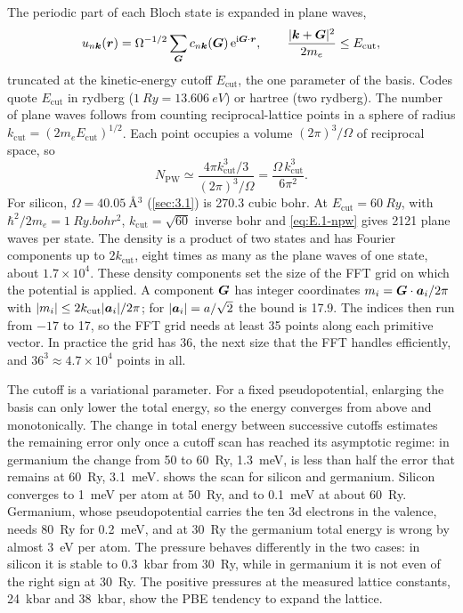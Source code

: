 The periodic part of each Bloch state is expanded in plane waves,
\begin{equation*}
  u_{n\bm{k}}(\bm{r}) = \Omega^{-1/2}\sum_{\bm{G}}c_{n\bm{k}}(\bm{G})\,\mathrm{e}^{\mathrm{i}\bm{G}\cdot\bm{r}}, \qquad \frac{|\bm{k} + \bm{G}|^2}{2m_e} \le E_{\mathrm{cut}} ,
\end{equation*}
truncated at the kinetic-energy cutoff $E_{\mathrm{cut}}$, the one parameter of the basis. Codes quote $E_{\mathrm{cut}}$ in rydberg ($\SI{1}{Ry} = \SI{13.606}{eV}$) or hartree (two rydberg). The number of plane waves follows from counting reciprocal-lattice points in a sphere of radius $k_{\mathrm{cut}} = (2m_eE_{\mathrm{cut}})^{1/2}$. Each point occupies a volume $(2\pi)^3/\Omega$ of reciprocal space, so
\begin{equation}
  N_{\mathrm{PW}} \simeq \frac{4\pi k_{\mathrm{cut}}^3/3}{(2\pi)^3/\Omega} = \frac{\Omega\,k_{\mathrm{cut}}^3}{6\pi^2} .
  \label{eq:E.1-npw}
\end{equation}
For silicon, $\Omega = \SI{40.05}{\angstrom^3}$ (\cref{sec:3.1}) is 270.3 cubic bohr. At $E_{\mathrm{cut}} = \SI{60}{Ry}$, with $\hbar^2/2m_e = \SI{1}{Ry.bohr^2}$, $k_{\mathrm{cut}} = \sqrt{60}$ inverse bohr and \cref{eq:E.1-npw} gives 2121 plane waves per state. The density is a product of two states and has Fourier components up to $2k_{\mathrm{cut}}$, eight times as many as the plane waves of one state, about $1.7\times10^4$. These density components set the size of the FFT grid on which the potential is applied. A component $\bm{G}$ has integer coordinates $m_i = \bm{G}\cdot\bm{a}_i/2\pi$ with $|m_i| \le 2k_{\mathrm{cut}}|\bm{a}_i|/2\pi$; for $|\bm{a}_i| = a/\sqrt{2}$ the bound is 17.9. The indices then run from $-17$ to 17, so the FFT grid needs at least 35 points along each primitive vector. In practice the grid has 36, the next size that the FFT handles efficiently, and $36^3 \approx 4.7\times10^4$ points in all.

The cutoff is a variational parameter. For a fixed pseudopotential, enlarging the basis can only lower the total energy, so the energy converges from above and monotonically. The change in total energy between successive cutoffs estimates the remaining error only once a cutoff scan has reached its asymptotic regime: in germanium the change from 50 to \SI{60}{Ry}, \SI{1.3}{meV}, is less than half the error that remains at \SI{60}{Ry}, \SI{3.1}{meV}.  shows the scan for silicon and germanium. Silicon converges to \SI{1}{meV} per atom at \SI{50}{Ry}, and to \SI{0.1}{meV} at about \SI{60}{Ry}. Germanium, whose pseudopotential carries the ten 3d electrons in the valence, needs \SI{80}{Ry} for \SI{0.2}{meV}, and at \SI{30}{Ry} the germanium total energy is wrong by almost \SI{3}{eV} per atom. The pressure behaves differently in the two cases: in silicon it is stable to \SI{0.3}{kbar} from \SI{30}{Ry}, while in germanium it is not even of the right sign at \SI{30}{Ry}. The positive pressures at the measured lattice constants, \SI{24}{kbar} and \SI{38}{kbar}, show the PBE tendency to expand the lattice.

